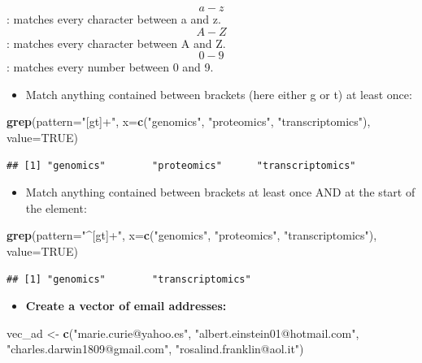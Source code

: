 \documentclass[]{book}
\newenvironment{Shaded}{\begin{snugshade}}{\end{snugshade}}
\newcommand{\DataTypeTok}[1]{\textcolor[rgb]{0.13,0.29,0.53}{#1}}
\newcommand{\KeywordTok}[1]{\textcolor[rgb]{0.13,0.29,0.53}{\textbf{#1}}}
\newcommand{\NormalTok}[1]{#1}
\newcommand{\OtherTok}[1]{\textcolor[rgb]{0.56,0.35,0.01}{#1}}
\newcommand{\StringTok}[1]{\textcolor[rgb]{0.31,0.60,0.02}{#1}}
\providecommand{\tightlist}{%
  \setlength{\itemsep}{0pt}\setlength{\parskip}{0pt}}
\begin{document}
\[a-z\]: matches every character between a and z.
\[A-Z\]: matches every character between A and Z.
\[0-9\]: matches every number between 0 and 9.

\begin{itemize}
\tightlist
\item
  Match anything contained between brackets (here either g or t) at least once:
\end{itemize}

\begin{Shaded}
\begin{Highlighting}[]
\KeywordTok{grep}\NormalTok{(}\DataTypeTok{pattern=}\StringTok{"[gt]+"}\NormalTok{, }
    \DataTypeTok{x=}\KeywordTok{c}\NormalTok{(}\StringTok{"genomics"}\NormalTok{, }\StringTok{"proteomics"}\NormalTok{, }\StringTok{"transcriptomics"}\NormalTok{), }
    \DataTypeTok{value=}\OtherTok{TRUE}\NormalTok{)}
\end{Highlighting}
\end{Shaded}

\begin{verbatim}
## [1] "genomics"        "proteomics"      "transcriptomics"
\end{verbatim}

\begin{itemize}
\tightlist
\item
  Match anything contained between brackets at least once AND at the start of the element:
\end{itemize}

\begin{Shaded}
\begin{Highlighting}[]
\KeywordTok{grep}\NormalTok{(}\DataTypeTok{pattern=}\StringTok{"^[gt]+"}\NormalTok{,}
        \DataTypeTok{x=}\KeywordTok{c}\NormalTok{(}\StringTok{"genomics"}\NormalTok{, }\StringTok{"proteomics"}\NormalTok{, }\StringTok{"transcriptomics"}\NormalTok{),}
        \DataTypeTok{value=}\OtherTok{TRUE}\NormalTok{)}
\end{Highlighting}
\end{Shaded}

\begin{verbatim}
## [1] "genomics"        "transcriptomics"
\end{verbatim}

\begin{itemize}
\tightlist
\item
  \textbf{Create a vector of email addresses:}
\end{itemize}

\begin{Shaded}
\begin{Highlighting}[]
\NormalTok{vec_ad <-}\StringTok{ }\KeywordTok{c}\NormalTok{(}\StringTok{"marie.curie@yahoo.es"}\NormalTok{, }\StringTok{"albert.einstein01@hotmail.com"}\NormalTok{, }
    \StringTok{"charles.darwin1809@gmail.com"}\NormalTok{, }\StringTok{"rosalind.franklin@aol.it"}\NormalTok{)}
\end{Highlighting}
\end{Shaded}
\end{document}
